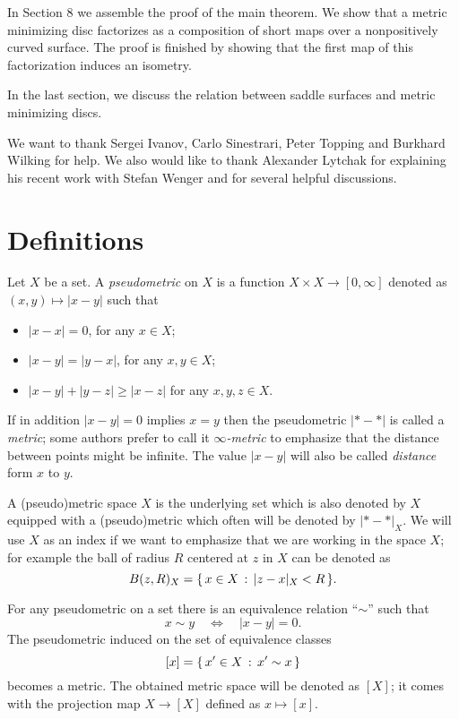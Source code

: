 \documentclass{article}
\begin{document}
In Section 8 we assemble the proof of the main theorem.
We show that a metric minimizing disc factorizes as a composition of short maps over a
nonpositively curved surface.
The proof is finished by showing that the first map of this factorization
induces an isometry.

In the last section, we discuss the relation between saddle surfaces and metric minimizing discs.

We want to thank 
Sergei Ivanov, 
Carlo Sinestrari, 
Peter Topping 
and Burkhard Wilking 
for help.
We also would like to thank Alexander Lytchak for explaining his recent work with Stefan Wenger and for several helpful discussions.


\section{Definitions}

Let $X$ be a set.
A \emph{pseudometric} on $X$ 
is a function $X\times X\to[0,\infty]$ denoted as $(x,y)\mapsto |x-y|$
such that 
\begin{itemize}
\item $|x-x|=0$, for any $x\in X$;
\item $|x-y|=|y-x|$, for any $x,y\in X$;
\item $|x-y|+|y-z|\ge|x-z|$ for any  $x,y,z\in X$.
\end{itemize}
If in addition $|x-y|=0$ implies $x=y$ then the pseudometric $|{*}-{*}|$ is called a \emph{metric}; some authors prefer to call it \emph{$\infty$-metric} to emphasize that the distance between points might be infinite.
The value $|x-y|$ will also be called \emph{distance} form $x$ to $y$.

A (pseudo)metric space $X$ is the underlying set which is also denoted by $X$ equipped with a (pseudo)metric which often will be denoted by $|{*}-{*}|_X$.
We will use $X$ as an index if we want to emphasize that we are working in the space $X$;
for example the ball of radius $R$ centered at $z$ in $X$ can be denoted as
\[B(z,R)_X=\{\,{x\in X}\,:\,{|z-x|_X<R}\,\}.\]


For any pseudometric on a set there is an equivalence relation ``$\sim$'' such that 
\[x\sim y\quad\iff\quad|x-y|=0.\]
The pseudometric induced  on the set of equivalence classes 
\[[x]=\{\,{x'\in X}\,:\,{x'\sim x}\,\}\] becomes a metric.
The obtained metric space will be denoted as $[X]$;
it comes with the projection map $X\to [X]$ defined as $x\mapsto [x]$.
\end{document}
